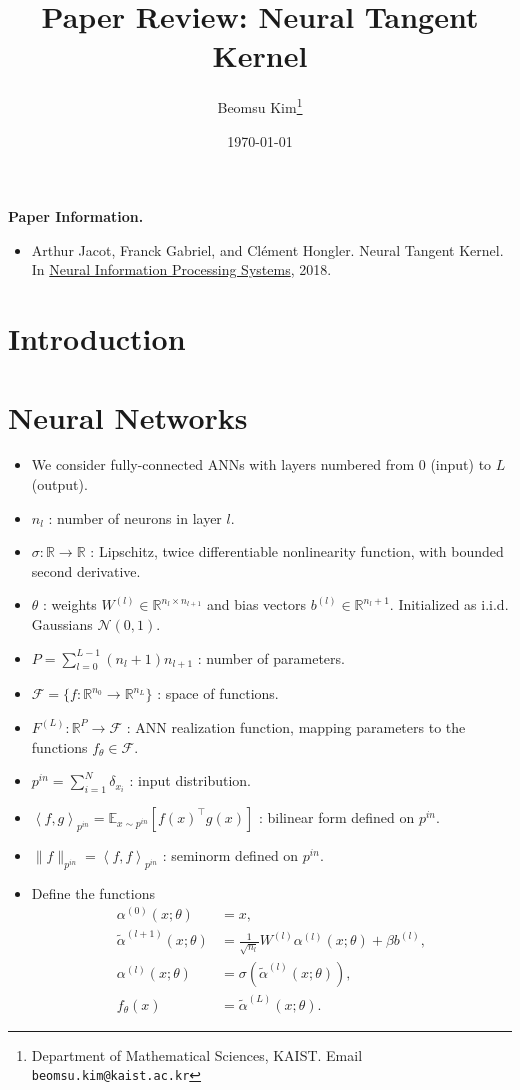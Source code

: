 \documentclass[10pt]{article}
\title{Paper Review: Neural Tangent Kernel}
\author{Beomsu Kim\footnote{Department of Mathematical Sciences, KAIST. Email \texttt{beomsu.kim@kaist.ac.kr}}}
\date{\today}
\newcommand{\RR}{\mathbb{R}}
\newcommand{\EE}{\mathbb{E}}
\newcommand{\FF}{\mathcal{F}}
\newcommand{\NN}{\mathcal{N}}
\newcommand{\inner}[2]{\left\langle #1, #2 \right\rangle}
\newcommand{\paran}[1]{{( #1 )}}
\newcommand{\pin}{{p^{in}}}
\begin{document}
\maketitle

\textbf{Paper Information.}

\begin{itemize}
\item Arthur Jacot, Franck Gabriel, and Cl\'{e}ment Hongler. Neural Tangent Kernel. \newline In \underline{Neural Information Processing Systems}, 2018.
\end{itemize}

\section{Introduction}

\section{Neural Networks}

\begin{itemize}
\item We consider fully-connected ANNs with layers numbered from $0$ (input) to $L$ (output).
\item $n_l$ : number of neurons in layer $l$.
\item $\sigma : \RR \rightarrow \RR$ : Lipschitz, twice differentiable nonlinearity function, with bounded second derivative.
\item $\theta$ : weights $W^\paran{l} \in \RR^{n_l \times n_{l + 1}}$ and bias vectors $b^\paran{l} \in \RR^{n_l + 1}$. Initialized as i.i.d. Gaussians $\NN(0,1)$.
\item $P = \sum_{l = 0}^{L - 1} (n_l + 1) n_{l + 1}$ : number of parameters.
\item $\FF = \{f : \RR^{n_0} \rightarrow \RR^{n_L}\}$ : space of functions.
\item $F^\paran{L} : \RR^P \rightarrow \FF$ : ANN realization function, mapping parameters to the functions $f_\theta \in \FF$.
\item $\pin = \sum_{i = 1}^N \delta_{x_i}$ : input distribution.
\item $\inner{f}{g}_{\pin} = \EE_{x \sim \pin} [f(x)^\top g(x)]$ : bilinear form defined on $\pin$.
\item $\| f \|_{\pin} = \inner{f}{f}_{\pin}$ : seminorm defined on $\pin$.
\item Define the functions
\begin{align*}
\alpha^\paran{0}(x;\theta) &= x, \\
\tilde{\alpha}^\paran{l + 1}(x;\theta) &= \frac{1}{\sqrt{n_l}} W^\paran{l} \alpha^\paran{l}(x;\theta) + \beta b^\paran{l}, \\
\alpha^\paran{l}(x;\theta) &= \sigma(\tilde{\alpha}^\paran{l}(x;\theta)), \\
f_\theta(x) &= \tilde{\alpha}^\paran{L}(x;\theta).
\end{align*}
\end{itemize}
\end{document}
